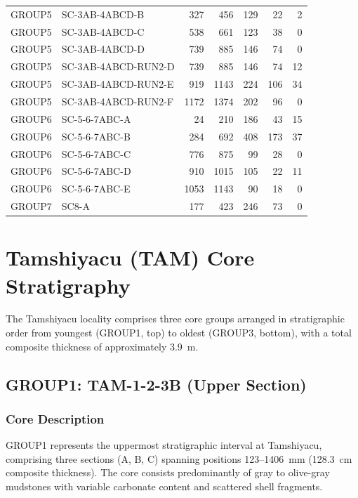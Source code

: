 \documentclass[11pt,a4paper]{article}
\begin{document}
\begin{longtable}{llrrrrr}
GROUP5 & SC-3AB-4ABCD-B & 327 & 456 & 129 & 22 & 2 \\
GROUP5 & SC-3AB-4ABCD-C & 538 & 661 & 123 & 38 & 0 \\
GROUP5 & SC-3AB-4ABCD-D & 739 & 885 & 146 & 74 & 0 \\
GROUP5 & SC-3AB-4ABCD-RUN2-D & 739 & 885 & 146 & 74 & 12 \\
GROUP5 & SC-3AB-4ABCD-RUN2-E & 919 & 1143 & 224 & 106 & 34 \\
GROUP5 & SC-3AB-4ABCD-RUN2-F & 1172 & 1374 & 202 & 96 & 0 \\
\midrule
GROUP6 & SC-5-6-7ABC-A & 24 & 210 & 186 & 43 & 15 \\
GROUP6 & SC-5-6-7ABC-B & 284 & 692 & 408 & 173 & 37 \\
GROUP6 & SC-5-6-7ABC-C & 776 & 875 & 99 & 28 & 0 \\
GROUP6 & SC-5-6-7ABC-D & 910 & 1015 & 105 & 22 & 11 \\
GROUP6 & SC-5-6-7ABC-E & 1053 & 1143 & 90 & 18 & 0 \\
\midrule
GROUP7 & SC8-A & 177 & 423 & 246 & 73 & 0 \\
\end{longtable}

\section{Tamshiyacu (TAM) Core Stratigraphy}

The Tamshiyacu locality comprises three core groups arranged in stratigraphic order from youngest (GROUP1, top) to oldest (GROUP3, bottom), with a total composite thickness of approximately 3.9~m.

\subsection{GROUP1: TAM-1-2-3B (Upper Section)}

\subsubsection{Core Description}

GROUP1 represents the uppermost stratigraphic interval at Tamshiyacu, comprising three sections (A, B, C) spanning positions 123--1406~mm (128.3~cm composite thickness). The core consists predominantly of gray to olive-gray mudstones with variable carbonate content and scattered shell fragments.
\end{document}
